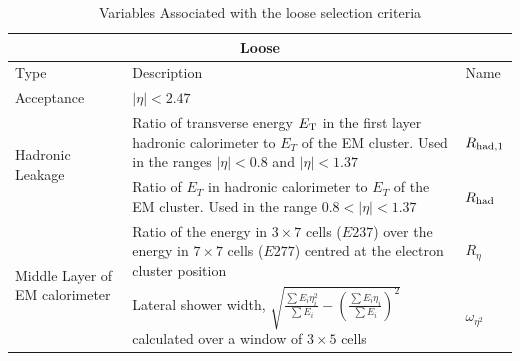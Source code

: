 \documentclass{article}
\begin{document}
\begin{table}[h!t]
\caption{ Variables Associated with the loose selection criteria \cite{ElectronPerformanceMeasurements}\label{table:looseVariables}}
\begin{tabular}{|p{5cm}|p{8cm}|p{1cm}| } 
\hline
\multicolumn{3}{|c|}{\textbf{Loose}}		\\\hline
Type&Description&Name		    \\\hline
Acceptance &  $|\eta|<2.47$ &  	\\\hline
\multirow{2}{*}{Hadronic Leakage} & Ratio of transverse energy $E_{\rm{T}}$ in the first layer hadronic calorimeter to $E_T$ of the EM cluster. Used in the ranges $|\eta|<0.8$ and $|\eta|<1.37$ & $R_{\rm{had,1}}$ \\\cline{2-3}
& Ratio of $E_T$ in hadronic calorimeter to $E_T$ of the EM cluster. Used in the range $0.8<|\eta|<1.37$ & $R_{\rm{had}}$\\\hline
\multirow{2}{*}{Middle Layer of EM calorimeter} & Ratio of the energy in $3\times7$ cells ($E237$) over the energy in $7\times7$ cells ($E277$) centred at the electron cluster position & $R_{\eta}$ \\\cline{2-3}
& Lateral shower width, $ \sqrt{\frac{\sum E_i \eta_{i}^{2}}{\sum E_i} - \left( \frac{\sum E_i \eta_i}{\sum E_i} \right)^2 }$ calculated over a window of $3\times5$ cells & $\omega_{\eta^2}$ \\\hline
\end{tabular}
\end{table}
\end{document}

